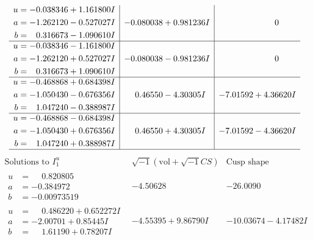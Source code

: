 \documentclass[1p]{elsarticle_modified}
\theoremstyle{definition}
\newcommand{\I}{\sqrt{-1}}
\begin{document}
$$\begin{array}{c|c|c}
\begin{aligned}
u &= -0.038346 + 1.161800 I \\
a &= -1.262120 - 0.527027 I \\
b &= \phantom{-}0.316673 - 1.090610 I\end{aligned}
 & -0.080038 + 0.981236 I & \phantom{-0.000000 } 0 \\ \hline\begin{aligned}
u &= -0.038346 - 1.161800 I \\
a &= -1.262120 + 0.527027 I \\
b &= \phantom{-}0.316673 + 1.090610 I\end{aligned}
 & -0.080038 - 0.981236 I & \phantom{-0.000000 } 0 \\ \hline\begin{aligned}
u &= -0.468868 + 0.684398 I \\
a &= -1.050430 - 0.676356 I \\
b &= \phantom{-}1.047240 - 0.388987 I\end{aligned}
 & \phantom{-}0.46550 - 4.30305 I & -7.01592 + 4.36620 I \\ \hline\begin{aligned}
u &= -0.468868 - 0.684398 I \\
a &= -1.050430 + 0.676356 I \\
b &= \phantom{-}1.047240 + 0.388987 I\end{aligned}
 & \phantom{-}0.46550 + 4.30305 I & -7.01592 - 4.36620 I\\
 \hline 
 \end{array}$$\newpage$$\begin{array}{c|c|c}  
\text{Solutions to }I^u_{1}& \I (\text{vol} + \sqrt{-1}CS) & \text{Cusp shape}\\
 \hline 
\begin{aligned}
u &= \phantom{-}0.820805\phantom{ +0.000000I} \\
a &= -0.384972\phantom{ +0.000000I} \\
b &= -0.00973519\phantom{ +0.000000I}\end{aligned}
 & -4.50628\phantom{ +0.000000I} & -26.0090\phantom{ +0.000000I} \\ \hline\begin{aligned}
u &= \phantom{-}0.486220 + 0.652272 I \\
a &= -2.00701 + 0.85445 I \\
b &= \phantom{-}1.61190 + 0.78207 I\end{aligned}
 & -4.55395 + 9.86790 I & -10.03674 - 4.17482 I \\ \hline\begin{aligned}

\end{aligned}
\end{array}$$
\end{document}
